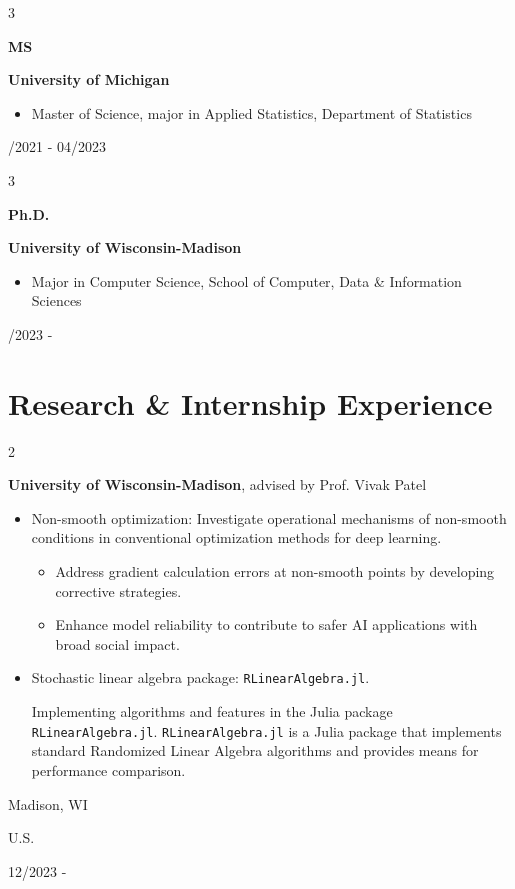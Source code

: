 \documentclass[10pt, letterpaper]{article}
\newenvironment{highlights}{
    \begin{itemize}[
        topsep=0.10 cm,
        parsep=0.10 cm,
        partopsep=0pt,
        itemsep=0pt,
        leftmargin=0.4 cm + 10pt
    ]
}{
    \end{itemize}
} %
\newenvironment{twocolentry}[2][]{
    \onecolentry
    \def\secondColumn{#2}
    \setcolumnwidth{\fill, 4.5 cm}
    \begin{paracol}{2}
}{
    \switchcolumn \raggedleft \secondColumn
    \end{paracol}
    \endonecolentry
} %
\newenvironment{threecolentry}[3][]{
    \onecolentry
    \def\thirdColumn{#3}
    \setcolumnwidth{1 cm, \fill, 4.5 cm}
    \begin{paracol}{3}
    {\raggedright #2} \switchcolumn
}{
    \switchcolumn \raggedleft \thirdColumn
    \end{paracol}
    \endonecolentry
} %
\begin{document}
        \begin{threecolentry}{\textbf{MS}}{
            08/2021 - 04/2023
        }
            \textbf{University of Michigan}
            \begin{highlights}
                \item Master of Science, major in Applied Statistics, Department of Statistics
            \end{highlights}
        \end{threecolentry}

        \begin{threecolentry}{\textbf{Ph.D.}}{
            08/2023 - 
        }
            \textbf{University of Wisconsin-Madison}
            \begin{highlights}
                \item Major in Computer Science, School of Computer, Data \& Information Sciences
            \end{highlights}
        \end{threecolentry}


    
    \section{Research \& Internship Experience}



        
        \begin{twocolentry}{
            Madison, WI

            U.S.

            12/2023 - 
        }
            \textbf{University of Wisconsin-Madison}, advised by Prof. Vivak Patel
            \begin{highlights}
                \item Non-smooth optimization: Investigate operational mechanisms of non-smooth conditions in conventional optimization methods for deep learning.
                \begin{highlights}
                \item Address gradient calculation errors at non-smooth points by developing corrective strategies.
                \item Enhance model reliability to contribute to safer AI applications with broad social impact.
                \end{highlights}
                \item Stochastic linear algebra package: \texttt{RLinearAlgebra.jl}.
                
                Implementing algorithms and features in the Julia package \texttt{RLinearAlgebra.jl}. 
                \texttt{RLinearAlgebra.jl} is a Julia package that implements standard Randomized Linear Algebra 
                algorithms and provides means for performance comparison.
            \end{highlights}
        \end{twocolentry}
\end{document}
